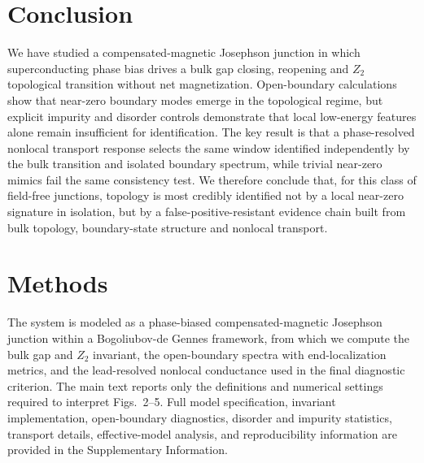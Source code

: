 \documentclass[11pt]{article}
\begin{document}

\section{Conclusion}

We have studied a compensated-magnetic Josephson junction in which superconducting phase bias drives a bulk gap closing, reopening and $Z_2$ topological transition without net magnetization. Open-boundary calculations show that near-zero boundary modes emerge in the topological regime, but explicit impurity and disorder controls demonstrate that local low-energy features alone remain insufficient for identification. The key result is that a phase-resolved nonlocal transport response selects the same window identified independently by the bulk transition and isolated boundary spectrum, while trivial near-zero mimics fail the same consistency test. We therefore conclude that, for this class of field-free junctions, topology is most credibly identified not by a local near-zero signature in isolation, but by a false-positive-resistant evidence chain built from bulk topology, boundary-state structure and nonlocal transport.

\section{Methods}

The system is modeled as a phase-biased compensated-magnetic Josephson junction within a Bogoliubov-de Gennes framework, from which we compute the bulk gap and $Z_2$ invariant, the open-boundary spectra with end-localization metrics, and the lead-resolved nonlocal conductance used in the final diagnostic criterion. The main text reports only the definitions and numerical settings required to interpret Figs.~2--5. Full model specification, invariant implementation, open-boundary diagnostics, disorder and impurity statistics, transport details, effective-model analysis, and reproducibility information are provided in the Supplementary Information.

\end{document}
